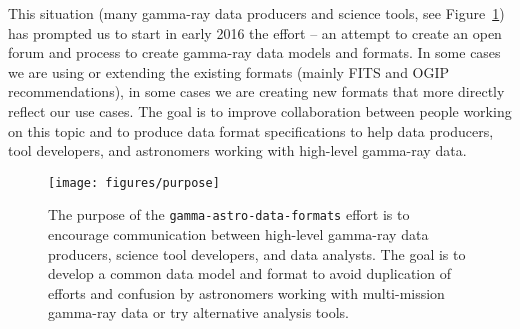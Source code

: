 This situation (many gamma-ray data producers and science tools, see Figure~\ref{fig:purpose}) has prompted us to start in early 2016 the \gadf effort -- an attempt to create an open forum and process to create gamma-ray data models and formats. In some cases we are using or extending the existing formats (mainly FITS and OGIP recommendations), in some cases we are creating new formats that more directly reflect our use cases. The goal is to improve collaboration between people working on this topic and to produce data format specifications to help data producers, tool developers, and astronomers working with high-level gamma-ray data.

\begin{figure}[tb]
\centerline{\texttt{[image: figures/purpose]}}
\caption{
The purpose of the \texttt{gamma-astro-data-formats} effort is to encourage communication between high-level gamma-ray data producers, science tool developers, and data analysts. The goal is to develop a common data model and format to avoid duplication of efforts and confusion by astronomers working with multi-mission gamma-ray data or try alternative analysis tools.
}
\label{fig:purpose}
\end{figure}



